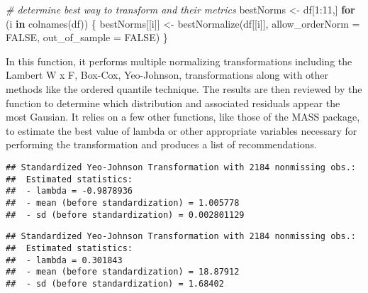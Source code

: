 \documentclass[
]{article}
\newenvironment{Shaded}{\begin{snugshade}}{\end{snugshade}}
\newcommand{\AttributeTok}[1]{\textcolor[rgb]{0.77,0.63,0.00}{#1}}
\newcommand{\CommentTok}[1]{\textcolor[rgb]{0.56,0.35,0.01}{\textit{#1}}}
\newcommand{\ConstantTok}[1]{\textcolor[rgb]{0.00,0.00,0.00}{#1}}
\newcommand{\ControlFlowTok}[1]{\textcolor[rgb]{0.13,0.29,0.53}{\textbf{#1}}}
\newcommand{\DecValTok}[1]{\textcolor[rgb]{0.00,0.00,0.81}{#1}}
\newcommand{\FunctionTok}[1]{\textcolor[rgb]{0.00,0.00,0.00}{#1}}
\newcommand{\NormalTok}[1]{#1}
\newcommand{\OtherTok}[1]{\textcolor[rgb]{0.56,0.35,0.01}{#1}}
\newcommand{\SpecialCharTok}[1]{\textcolor[rgb]{0.00,0.00,0.00}{#1}}
\begin{document}
\begin{Shaded}
\begin{Highlighting}[]
\CommentTok{\# determine best way to transform and their metrics}
\NormalTok{bestNorms }\OtherTok{\textless{}{-}}\NormalTok{ df[}\DecValTok{1}\SpecialCharTok{:}\DecValTok{11}\NormalTok{,]}
\ControlFlowTok{for}\NormalTok{ (i }\ControlFlowTok{in} \FunctionTok{colnames}\NormalTok{(df)) \{}
\NormalTok{  bestNorms[[i]] }\OtherTok{\textless{}{-}} \FunctionTok{bestNormalize}\NormalTok{(df[[i]], }\AttributeTok{allow\_orderNorm =} \ConstantTok{FALSE}\NormalTok{, }\AttributeTok{out\_of\_sample =} \ConstantTok{FALSE}\NormalTok{)}
\NormalTok{\}}
\end{Highlighting}
\end{Shaded}

In this function, it performs multiple normalizing transformations
including the Lambert W x F, Box-Cox, Yeo-Johnson, transformations along
with other methods like the ordered quantile technique. The results are
then reviewed by the function to determine which distribution and
associated residuals appear the most Gausian. It relies on a few other
functions, like those of the MASS package, to estimate the best value of
lambda or other appropriate variables necessary for performing the
transformation and produces a list of recommendations.

\begin{Shaded}
\end{Shaded}

\begin{verbatim}
## Standardized Yeo-Johnson Transformation with 2184 nonmissing obs.:
##  Estimated statistics:
##  - lambda = -0.9878936 
##  - mean (before standardization) = 1.005778 
##  - sd (before standardization) = 0.002801129
\end{verbatim}

\begin{Shaded}
\end{Shaded}

\begin{verbatim}
## Standardized Yeo-Johnson Transformation with 2184 nonmissing obs.:
##  Estimated statistics:
##  - lambda = 0.301843 
##  - mean (before standardization) = 18.87912 
##  - sd (before standardization) = 1.68402
\end{verbatim}
\end{document}

